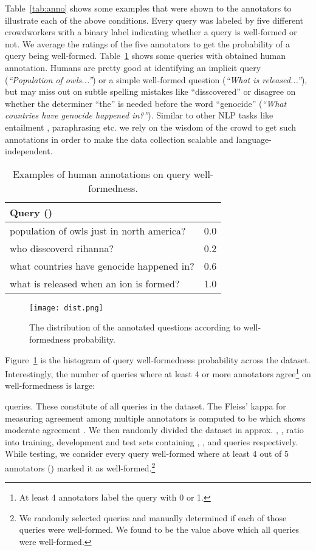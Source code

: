 \documentclass[11pt,a4paper]{article}
\begin{document}
Table~\ref{tab:anno} shows some examples that were shown to the annotators
to illustrate each of the above conditions. Every query was labeled by five
different crowdworkers with a binary label indicating whether a query is
well-formed or not. We average the ratings of the five annotators to
get the probability of a query being well-formed. 
Table~\ref{tab:labeledqueries} shows some queries with obtained human annotation.
Humans are pretty good at identifying an implicit query (\textit{``Population of
owls...''}) or a simple well-formed question (\textit{``What is released...''}), but
may miss out on subtle spelling mistakes like ``disscovered'' or disagree on
whether the determiner ``the'' is needed before the word ``genocide'' (\textit{``What countries have genocide happened in?''}).
Similar to other NLP tasks like entailment \cite{dagan2006pascal,bowman:2015}, 
paraphrasing \cite{meandev} etc. we rely on the wisdom of the
crowd to get such annotations in order to make the
data collection scalable and language-independent.

\begin{table}[!tb]
\centering
\begin{tabular}{|p{5.5cm}|r|}
\hline
Query () &  \\
\hline
population of owls just in north america? & 0.0 \\
who disscoverd rihanna? & 0.2 \\
what countries have genocide happened in? & 0.6 \\
what is released when an ion is formed? & 1.0 \\
\hline
\end{tabular}
\label{tab:labeledqueries}
\caption{Examples of human annotations on query well-formedness.}
\end{table}

\begin{figure}[!tb]
    \centering
    \texttt{[image: dist.png]}
    \caption{The distribution of the annotated questions according
    to well-formedness probability.}
    \label{fig:dist}
\end{figure}

Figure~\ref{fig:dist} is the histogram of query well-formedness probability across
the dataset. Interestingly, the number of queries where at least 4 or more annotators 
agree\footnote{At least 4 annotators label the query with 0 or 1.} on
well-formedness is large:

queries. These constitute  of all queries in the dataset. 
The Fleiss' kappa \cite{fleiss1971measuring} for measuring agreement among multiple
annotators is computed to be  which shows moderate agreement \cite{landis1977measurement}.
We then randomly divided the dataset in approx. , ,  ratio into
training, development and test sets containing , , and  queries respectively.  While testing, we consider every query well-formed where at least 4 out of 5 
annotators () marked it as well-formed.\footnote{We randomly selected  queries and
manually determined if each of those queries were well-formed. We found  to be the
value above which all queries were well-formed.}
\end{document}
